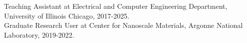 \begin{singlespace}
\begin{description}[labelwidth=4cm,leftmargin=4.2cm,itemsep=1em]
\begin{itemize}[label={},listparindent=0pt,itemindent=0pt,leftmargin=0pt,itemsep=1em,parsep=0pt,topsep=0pt,partopsep=0pt]
   			Teaching Assistant at Electrical and Computer Engineering Department, University of Illinois Chicago, 2017-2025.\\
   			
   			Graduate Research User at Center for Nanoscale Materials, Argonne National Laboratory, 2019-2022.
        		 \end{itemize}
    \end{description}
\end{singlespace}
